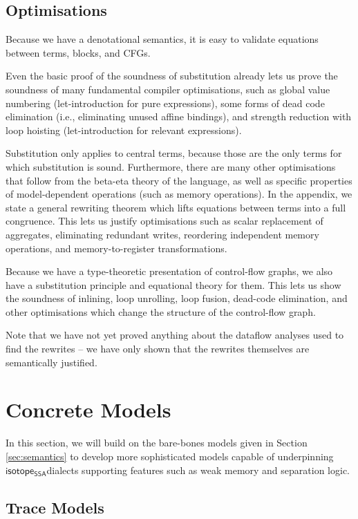 \documentclass[acmsmall,screen,review]{acmart}
\newcommand{\ms}[1]{\ensuremath{\mathsf{#1}}}
\newcommand{\isotopessa}{\ms{isotope_{SSA}}}
\begin{document}
\subsection{Optimisations}

Because we have a denotational semantics, it is easy to validate equations
between terms, blocks, and CFGs.

Even the basic proof of the soundness of substitution already lets us prove the
soundness of many fundamental compiler optimisations, such as global value
numbering (let-introduction for pure expressions), some forms of dead code
elimination (i.e., eliminating unused affine bindings), and strength reduction
with loop hoisting (let-introduction for relevant expressions). 

Substitution only applies to central terms, because those are the only terms for
which substitution is sound. Furthermore, there are many other optimisations
that follow from the beta-eta theory of the language, as well as specific
properties of model-dependent operations (such as memory operations). In the
appendix, we state a general rewriting theorem which lifts equations between
terms into a full congruence. This lets us justify optimisations such as scalar
replacement of aggregates, eliminating redundant writes, reordering independent
memory operations, and memory-to-register transformations.

Because we have a type-theoretic presentation of control-flow graphs, we also
have a substitution principle and equational theory for them. This lets us show
the soundness of inlining, loop unrolling, loop fusion, dead-code elimination,
and other optimisations which change the structure of the control-flow graph.

Note that we have not yet proved anything about the dataflow analyses used to
find the rewrites -- we have only shown that the rewrites themselves are
semantically justified.

\section{Concrete Models}

In this section, we will build on the bare-bones models given in Section
\ref{sec:semantics} to develop more sophisticated models capable of underpinning
\isotopessa dialects supporting features such as weak memory and separation
logic.

\subsection{Trace Models}
\end{document}
